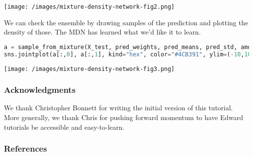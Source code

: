 \texttt{[image: /images/mixture-density-network-fig2.png]}

We can check the ensemble by drawing samples of the prediction and
plotting the density of those. The MDN has learned what we'd like it
to learn.

\begin{lstlisting}[language=Python]
a = sample_from_mixture(X_test, pred_weights, pred_means, pred_std, amount=len(X_test))
sns.jointplot(a[:,0], a[:,1], kind="hex", color="#4CB391", ylim=(-10,10), xlim=(-14,14))
\end{lstlisting}

\texttt{[image: /images/mixture-density-network-fig3.png]}

\subsubsection{Acknowledgments}

We thank Christopher Bonnett for writing the initial version
of this tutorial. More generally, we thank Chris for pushing forward
momentum to have Edward tutorials be accessible and easy-to-learn.

\subsubsection{References}\label{references}
